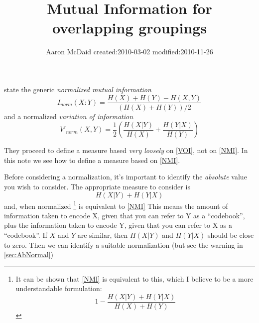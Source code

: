 \documentclass[9pt,technote]{IEEEtran}
\author{Aaron McDaid created:2010-03-02 modified:2010-11-26}
\title{Mutual Information for overlapping groupings}
\begin{document}
\maketitle


\newcommand{\grouping}{\emph{grouping{}}}

\citet{lancichinetti-2009} state the generic \emph{normalized mutual information}
\begin{equation}
	I_{norm}(X:Y) = \frac { H(X) + H(Y) - H(X,Y) } { \left( H(X) + H(Y) \right ) /2 }   \label{NMI}
\end{equation}
and a normalized \emph{variation of information} 
\begin{equation}
	V'_{norm}(X,Y) = \frac12 \left(  \frac{ H(X|Y) }{ H(X) } + \frac{ H(Y|X) }{ H(Y) } \right)   \label{VOI}
\end{equation}

They proceed to define a measure based \emph{very loosely} on \cref{VOI}, not on \cref{NMI}. In this note we see how to define a measure
based on \cref{NMI}.

Before considering a normalization, it's important to identify the \emph{absolute} value you wish to consider.
The appropriate measure to consider is
\begin{equation}
	H(X|Y) + H(Y|X)   \label{CorrectMI}
\end{equation}
and, when normalized \footnote{
	It can be shown that \cref{NMI} is equivalent to this, which I believe to be a more understandable formulation:
 \[
	1 - \frac { H(X|Y) + H(Y|X)  }{ H(X) + H(Y) } 
	\]
} is equivalent to \cref{NMI}
This means the amount of information taken to encode X, given that you can refer to Y as a ``codebook'', plus
the information taken to encode Y, given that you can refer to X as a ``codebook''. If $X$ and $Y$ are similar, then
$H(X|Y)$ and $H(Y|X)$ should be close to zero. Then we can identify a suitable normalization (but see the warning in \cref{sec:AbNormal})

\begin{comment}
\section{WARNING}
I'm pretty sloppy, as ever, with my terminology. I just take $H(x)$ to mean the number of bits taken to encode $x$. Hence
I tend to think in $\log_2$, the log to the base 2, when technically I suppose it should be $\log_e$. There's lots of other careless things too, no doubt \begin{turn}{90}(-:\end{turn}.
\end{comment}
\end{document}
